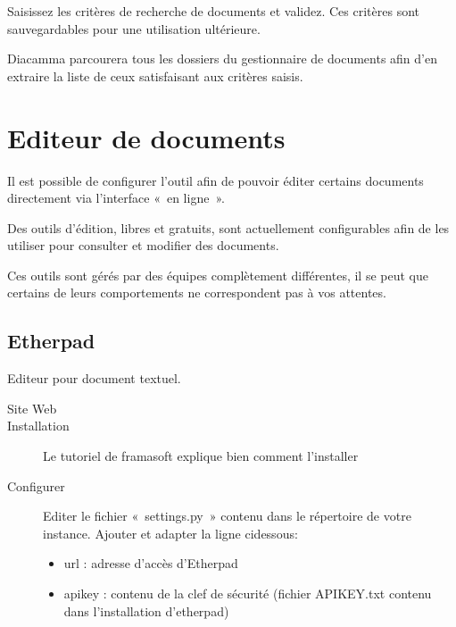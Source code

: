 \documentclass[letterpaper,10pt,french]{sphinxmanual}
\begin{document}
Saisissez les critères de recherche de documents et validez. Ces critères sont sauvegardables pour une utilisation ultérieure.

Diacamma parcourera tous les dossiers du gestionnaire de documents afin d’en extraire la liste de ceux satisfaisant aux critères saisis.


\section{Editeur de documents}
\label{\detokenize{documents/editor:editeur-de-documents}}\label{\detokenize{documents/editor::doc}}
Il est possible de configurer l’outil afin de pouvoir éditer certains documents directement via l’interface « en ligne ».

Des outils d’édition, libres et gratuits, sont actuellement configurables afin de les utiliser pour consulter et modifier des documents.

 Ces outils sont gérés par des équipes complètement différentes, il se peut que certains de leurs comportements ne correspondent pas à vos attentes.


\subsection{Etherpad}
\label{\detokenize{documents/editor:etherpad}}
Editeur pour document textuel.
\begin{description}
\item[{Site Web}] \leavevmode
{}

\item[{Installation}] \leavevmode
Le tutoriel de framasoft explique bien comment l’installer

\item[{Configurer}] \leavevmode
Editer le fichier « settings.py » contenu dans le répertoire de votre instance.
Ajouter et adapter la ligne ci\sphinxhyphen{}dessous:
\begin{itemize}
\item {} 
url : adresse d’accès d’Etherpad

\item {} 
apikey : contenu de la clef de sécurité (fichier APIKEY.txt contenu dans l’installation d’etherpad)

\end{itemize}

\end{description}
\end{document}
